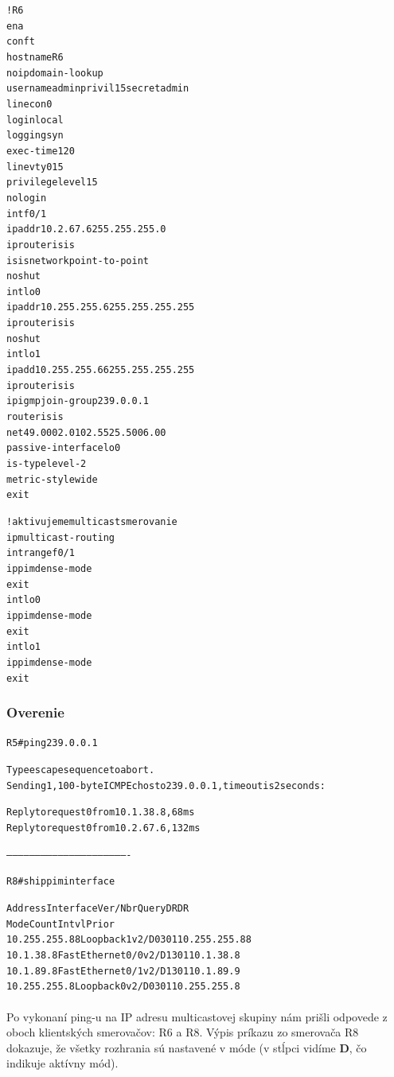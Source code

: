 \documentclass[12pt,twoside,a4paper]{report}
\begin{document}
\noindent
{\selectfont
\begin{small}
\begin{alltt}
!R6
ena
conf t
hostname R6
no ip domain-lookup
username admin privil 15 secret admin
line con 0
  login local
  logging syn
  exec-time 120
line vty 0 15
  privilege level 15
  no login
int f0/1
  ip addr 10.2.67.6 255.255.255.0
  ip router isis
  isis network point-to-point
  no shut
int lo0
  ip addr 10.255.255.6 255.255.255.255
  ip router isis
  no shut
int lo1
  ip add 10.255.255.66 255.255.255.255
  ip router isis
  ip igmp join-group 239.0.0.1
router isis
  net 49.0002.0102.5525.5006.00
  passive-interface lo0
  is-type level-2
  metric-style wide
  exit

!aktivujeme multicast smerovanie
ip multicast-routing
int range f0/1
  ip pim dense-mode
  exit
int lo0
  ip pim dense-mode
  exit
int lo1
  ip pim dense-mode
  exit
\end{alltt}
\end{small}
}

\subsubsection{Overenie}

\noindent
{\selectfont
\begin{small}
\begin{alltt}
R5#ping 239.0.0.1

Type escape sequence to abort.
Sending 1, 100-byte ICMP Echos to 239.0.0.1, timeout is 2 seconds:

Reply to request 0 from 10.1.38.8, 68 ms
Reply to request 0 from 10.2.67.6, 132 ms


----------------------------------------------------------------


R8#sh ip pim interface

Address          Interface         Ver/   Nbr    Query  DR     DR
                                   Mode   Count  Intvl  Prior
10.255.255.88    Loopback1         v2/D   0      30     1      10.255.255.88
10.1.38.8        FastEthernet0/0   v2/D   1      30     1      10.1.38.8
10.1.89.8        FastEthernet0/1   v2/D   1      30     1      10.1.89.9
10.255.255.8     Loopback0         v2/D   0      30     1      10.255.255.8

\end{alltt}
\end{small}
}

\paragraph{}
Po vykonaní ping-u na IP adresu multicastovej skupiny nám prišli odpovede z oboch klientských smerovačov: R6 a R8. Výpis príkazu  zo smerovača R8 dokazuje, že všetky rozhrania sú nastavené v  móde (v stĺpci  vidíme \textbf{D}, čo indikuje aktívny  mód).
\end{document}
